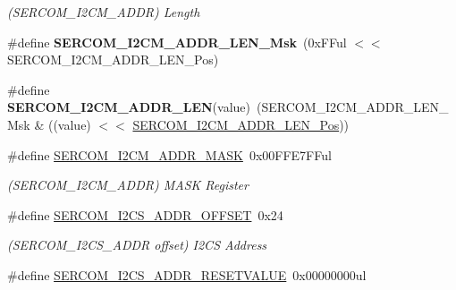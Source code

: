 \begin{DoxyCompactItemize}
\begin{DoxyCompactList}\small\item\em (S\+E\+R\+C\+O\+M\+\_\+\+I2\+C\+M\+\_\+\+A\+D\+D\+R) Length \end{DoxyCompactList}\item 
\hypertarget{group___s_a_m_l21___s_e_r_c_o_m_ga28aed5b4fedada8942cf629bcaa566c6}{}\#define {\bfseries S\+E\+R\+C\+O\+M\+\_\+\+I2\+C\+M\+\_\+\+A\+D\+D\+R\+\_\+\+L\+E\+N\+\_\+\+Msk}~(0x\+F\+Ful $<$$<$ S\+E\+R\+C\+O\+M\+\_\+\+I2\+C\+M\+\_\+\+A\+D\+D\+R\+\_\+\+L\+E\+N\+\_\+\+Pos)\label{group___s_a_m_l21___s_e_r_c_o_m_ga28aed5b4fedada8942cf629bcaa566c6}

\item 
\hypertarget{group___s_a_m_l21___s_e_r_c_o_m_ga39c51eddb3fa5f8e66e2d3b28a5f6a0a}{}\#define {\bfseries S\+E\+R\+C\+O\+M\+\_\+\+I2\+C\+M\+\_\+\+A\+D\+D\+R\+\_\+\+L\+E\+N}(value)~(S\+E\+R\+C\+O\+M\+\_\+\+I2\+C\+M\+\_\+\+A\+D\+D\+R\+\_\+\+L\+E\+N\+\_\+\+Msk \& ((value) $<$$<$ \hyperlink{group___s_a_m_l21___s_e_r_c_o_m_ga1b1cb66bc06691628402f6552cc4d573}{S\+E\+R\+C\+O\+M\+\_\+\+I2\+C\+M\+\_\+\+A\+D\+D\+R\+\_\+\+L\+E\+N\+\_\+\+Pos}))\label{group___s_a_m_l21___s_e_r_c_o_m_ga39c51eddb3fa5f8e66e2d3b28a5f6a0a}

\item 
\hypertarget{group___s_a_m_l21___s_e_r_c_o_m_gaad820f07476f5be7db86d968008fabaf}{}\#define \hyperlink{group___s_a_m_l21___s_e_r_c_o_m_gaad820f07476f5be7db86d968008fabaf}{S\+E\+R\+C\+O\+M\+\_\+\+I2\+C\+M\+\_\+\+A\+D\+D\+R\+\_\+\+M\+A\+S\+K}~0x00\+F\+F\+E7\+F\+Ful\label{group___s_a_m_l21___s_e_r_c_o_m_gaad820f07476f5be7db86d968008fabaf}

\begin{DoxyCompactList}\small\item\em (S\+E\+R\+C\+O\+M\+\_\+\+I2\+C\+M\+\_\+\+A\+D\+D\+R) M\+A\+S\+K Register \end{DoxyCompactList}\item 
\hypertarget{group___s_a_m_l21___s_e_r_c_o_m_gaa628247540816fff57bb19edcfe2be3b}{}\#define \hyperlink{group___s_a_m_l21___s_e_r_c_o_m_gaa628247540816fff57bb19edcfe2be3b}{S\+E\+R\+C\+O\+M\+\_\+\+I2\+C\+S\+\_\+\+A\+D\+D\+R\+\_\+\+O\+F\+F\+S\+E\+T}~0x24\label{group___s_a_m_l21___s_e_r_c_o_m_gaa628247540816fff57bb19edcfe2be3b}

\begin{DoxyCompactList}\small\item\em (S\+E\+R\+C\+O\+M\+\_\+\+I2\+C\+S\+\_\+\+A\+D\+D\+R offset) I2\+C\+S Address \end{DoxyCompactList}\item 
\hypertarget{group___s_a_m_l21___s_e_r_c_o_m_ga02e529e24e6f8249d665398fea94b78f}{}\#define \hyperlink{group___s_a_m_l21___s_e_r_c_o_m_ga02e529e24e6f8249d665398fea94b78f}{S\+E\+R\+C\+O\+M\+\_\+\+I2\+C\+S\+\_\+\+A\+D\+D\+R\+\_\+\+R\+E\+S\+E\+T\+V\+A\+L\+U\+E}~0x00000000ul\label{group___s_a_m_l21___s_e_r_c_o_m_ga02e529e24e6f8249d665398fea94b78f}


\end{DoxyCompactItemize}
